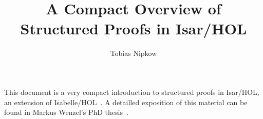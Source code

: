 \documentclass[11pt,a4paper]{article}
\begin{document}
\title{A Compact Overview of Structured Proofs in Isar/HOL}
\author{Tobias Nipkow}
\date{}
\maketitle

\noindent
This document is a very compact introduction to structured proofs in
Isar/HOL, an extension of Isabelle/HOL~\cite{LNCS2283}. A detailled
exposition of this material can be found in Markus Wenzel's PhD
thesis~\cite{Wenzel-PhD}.



%





\end{document}
